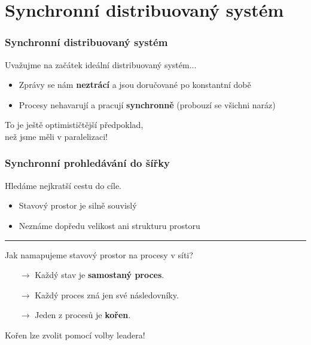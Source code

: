 \documentclass[usenames,dvipsnames,9pt]{beamer}
\begin{document}
\section{Synchronní distribuovaný systém}

\begin{frame}
\frametitle{Synchronní distribuovaný systém}

Uvažujme na začátek ideální distribuovaný systém...
\hspace{10pt}\begin{itemize}
  \item Zprávy se nám {\bf neztrácí} a jsou doručované po konstantní době
  \item Procesy nehavarují a pracují {\bf synchronně} (probouzí se všichni naráz)
\end{itemize}

\vspace{2em}\pause
\begin{center}
\Large To je ještě optimističtější předpoklad,\\ než jsme měli v paralelizaci!
\end{center}

\end{frame}

\begin{frame}
\frametitle{Synchronní prohledávání do šířky}

Hledáme nejkratší cestu do cíle.

\begin{itemize}
\item Stavový prostor je silně souvislý
\item Neznáme dopředu velikost ani strukturu prostoru
\end{itemize}

  \pause\vspace{1em}\hrule\vspace{1em}

  \begin{center}
  Jak namapujeme stavový prostor na procesy v síti?
  \end{center}
  \pause
  \begin{itemize}
\item[$\rightarrow$] Každý stav je {\bf samostaný proces}.
\item[$\rightarrow$]  Každý proces zná jen své následovníky.
\item[$\rightarrow$] Jeden z procesů je {\bf kořen}.
\end{itemize}

\hfill Kořen lze zvolit pomocí volby leadera!

\end{frame}
\end{document}
